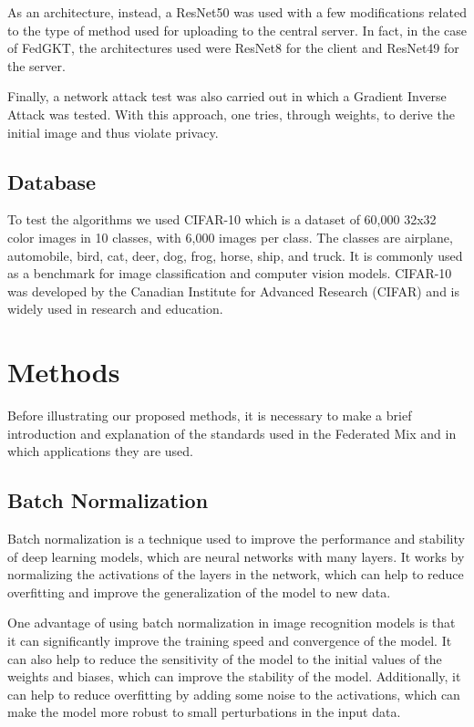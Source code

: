 \documentclass[conference]{IEEEtran}
\begin{document}
As an architecture, instead, a ResNet50 \cite{b6} was used with a few modifications related to the type of method used for uploading to the central server. In fact, in the case of FedGKT, the architectures used were ResNet8 for the client and ResNet49 for the server. 

Finally, a network attack test was also carried out in which a Gradient Inverse Attack \cite{b7} was tested. With this approach, one tries, through weights, to derive the initial image and thus violate privacy.

\subsection{Database}
To test the algorithms we used CIFAR-10 which is a dataset of 60,000 32x32 color images in 10 classes, with 6,000 images per class. The classes are airplane, automobile, bird, cat, deer, dog, frog, horse, ship, and truck. It is commonly used as a benchmark for image classification and computer vision models. CIFAR-10 was developed by the Canadian Institute for Advanced Research (CIFAR) and is widely used in research and education.

\section{Methods}

Before illustrating our proposed methods, it is necessary to make a brief introduction and explanation of the standards used in the Federated Mix and in which applications they are used.

\subsection{Batch Normalization}

Batch normalization is a technique used to improve the performance and stability of deep learning models, which are neural networks with many layers. It works by normalizing the activations of the layers in the network, which can help to reduce overfitting and improve the generalization of the model to new data.

One advantage of using batch normalization in image recognition models is that it can significantly improve the training speed and convergence of the model. It can also help to reduce the sensitivity of the model to the initial values of the weights and biases, which can improve the stability of the model. Additionally, it can help to reduce overfitting by adding some noise to the activations, which can make the model more robust to small perturbations in the input data.
\end{document}
